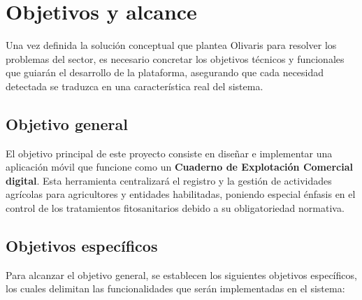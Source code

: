 \section{Objetivos y alcance}

Una vez definida la solución conceptual que plantea Olivaris para resolver los problemas del sector, es necesario concretar los objetivos técnicos y funcionales que guiarán el desarrollo de la plataforma, asegurando que cada 
necesidad detectada se traduzca en una característica real del sistema.

\subsection{Objetivo general}

El objetivo principal de este proyecto consiste en diseñar e implementar una aplicación móvil que funcione como un \textbf{Cuaderno de Explotación Comercial digital}. Esta herramienta centralizará el registro y la gestión de actividades 
agrícolas para agricultores y entidades habilitadas, poniendo especial énfasis en el control de los tratamientos fitosanitarios debido a su obligatoriedad normativa.

\subsection{Objetivos específicos}

Para alcanzar el objetivo general, se establecen los siguientes objetivos específicos, los cuales delimitan las funcionalidades que serán implementadas en el sistema:

